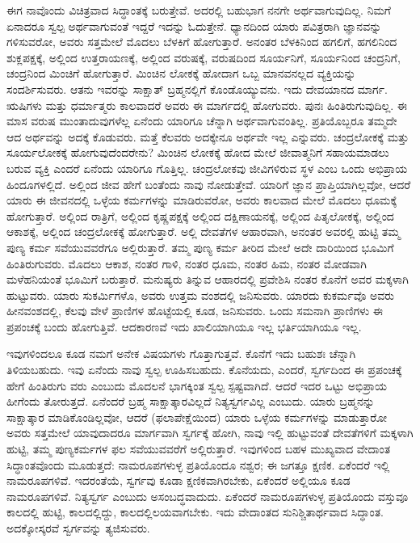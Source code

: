 \vskip 5pt

ಈಗ ನಾವೊಂದು ವಿಚಿತ್ರವಾದ ಸಿದ್ಧಾಂತಕ್ಕೆ ಬರುತ್ತೇವೆ. ಅದರಲ್ಲಿ ಬಹುಭಾಗ ನನಗೇ ಅರ್ಥವಾಗುವುದಿಲ್ಲ. ನಿಮಗೆ ಏನಾದರೂ ಸ್ವಲ್ಪ ಅರ್ಥವಾಗುವಂತೆ ಇದ್ದರೆ ಇದನ್ನು ಓದುತ್ತೇನೆ. ಧ್ಯಾನದಿಂದ ಯಾರು ಪವಿತ್ರರಾಗಿ ಜ್ಞಾನವನ್ನು ಗಳಿಸುವರೋ, ಅವರು ಸತ್ತಮೇಲೆ ಮೊದಲು ಬೆಳಕಿಗೆ ಹೋಗುತ್ತಾರೆ. ಅನಂತರ ಬೆಳಕಿನಿಂದ ಹಗಲಿಗೆ, ಹಗಲಿನಿಂದ ಶುಕ್ಲಪಕ್ಷಕ್ಕೆ, ಅಲ್ಲಿಂದ ಉತ್ತರಾಯಣಕ್ಕೆ, ಅಲ್ಲಿಂದ ವರುಷಕ್ಕೆ, ವರುಷದಿಂದ ಸೂರ್ಯನಿಗೆ, ಸೂರ್ಯನಿಂದ ಚಂದ್ರನಿಗೆ, ಚಂದ್ರನಿಂದ ಮಿಂಚಿಗೆ ಹೋಗುತ್ತಾರೆ. ಮಿಂಚಿನ ಲೋಕಕ್ಕೆ ಹೋದಾಗ ಒಬ್ಬ ಮಾನವನಲ್ಲದ ವ್ಯಕ್ತಿಯನ್ನು ಸಂದರ್ಶಿಸುವರು. ಆತನು ಇವರನ್ನು ಸಾಕ್ಷಾತ್​ ಬ್ರಹ್ಮನಲ್ಲಿಗೆ ಕೊಂಡೊಯ್ಯುವನು. ಇದು ದೇವಯಾನದ ಮಾರ್ಗ. ಋಷಿಗಳು ಮತ್ತು ಧರ್ಮಾತ್ಮರು ಕಾಲವಾದರೆ ಅವರು ಈ ಮಾರ್ಗದಲ್ಲಿ ಹೋಗುವರು. ಪುನಃ ಹಿಂತಿರುಗುವುದಿಲ್ಲ. ಈ ಮಾಸ ವರುಷ ಮುಂತಾದುವುಗಳೆಲ್ಲ ಏನೆಂದು ಯಾರಿಗೂ ಚೆನ್ನಾಗಿ ಅರ್ಥವಾಗುವಂತಿಲ್ಲ. ಪ್ರತಿಯೊಬ್ಬರೂ ತಮ್ಮದೇ ಆದ ಅರ್ಥವನ್ನು ಅದಕ್ಕೆ ಕೊಡುವರು. ಮತ್ತೆ ಕೆಲವರು ಅದಕ್ಕೇನೂ ಅರ್ಥವೇ ಇಲ್ಲ ಎನ್ನುವರು. ಚಂದ್ರಲೋಕಕ್ಕೆ ಮತ್ತು ಸೂರ್ಯಲೋಕಕ್ಕೆ ಹೋಗುವುದೆಂದರೇನು? ಮಿಂಚಿನ ಲೋಕಕ್ಕೆ ಹೋದ ಮೇಲೆ ಜೀವಾತ್ಮನಿಗೆ ಸಹಾಯಮಾಡಲು ಬರುವ ವ್ಯಕ್ತಿ ಎಂದರೆ ಏನೆಂದು ಯಾರಿಗೂ ಗೊತ್ತಿಲ್ಲ. ಚಂದ್ರಲೋಕವು ಜೀವಿಗಳಿರುವ ಸ್ಥಳ ಎಂಬ ಒಂದು ಅಭಿಪ್ರಾಯ ಹಿಂದೂಗಳಲ್ಲಿದೆ. ಅಲ್ಲಿಂದ ಜೀವ ಹೇಗೆ ಬಂತೆಂದು ನಾವು ನೋಡುತ್ತೇವೆ. ಯಾರಿಗೆ ಜ್ಞಾನ ಪ್ರಾಪ್ತಿಯಾಗಿಲ್ಲವೋ, ಆದರೆ ಯಾರು ಈ ಜೀವನದಲ್ಲಿ ಒಳ್ಳೆಯ ಕರ್ಮಗಳನ್ನು ಮಾಡಿರುವರೋ, ಅವರು ಕಾಲವಾದ ಮೇಲೆ ಮೊದಲು ಧೂಮಕ್ಕೆ ಹೋಗುತ್ತಾರೆ. ಅಲ್ಲಿಂದ ರಾತ್ರಿಗೆ, ಅಲ್ಲಿಂದ ಕೃಷ್ಣಪಕ್ಷಕ್ಕೆ ಅಲ್ಲಿಂದ ದಕ್ಷಿಣಾಯನಕ್ಕೆ, ಅಲ್ಲಿಂದ ಪಿತೃಲೋಕಕ್ಕೆ, ಅಲ್ಲಿಂದ ಆಕಾಶಕ್ಕೆ, ಅಲ್ಲಿಂದ ಚಂದ್ರಲೋಕಕ್ಕೆ ಹೋಗುತ್ತಾರೆ. ಅಲ್ಲಿ ದೇವತೆಗಳ ಆಹಾರವಾಗಿ, ಅನಂತರ ಅವರಲ್ಲಿ ಹುಟ್ಟಿ ತಮ್ಮ ಪುಣ್ಯ ಕರ್ಮ ಸವೆಯುವವರೆಗೂ ಅಲ್ಲಿರುತ್ತಾರೆ. ತಮ್ಮ ಪುಣ್ಯ ಕರ್ಮ ತೀರಿದ ಮೇಲೆ ಅದೇ ದಾರಿಯಿಂದ ಭೂಮಿಗೆ ಹಿಂತಿರುಗುವರು. ಮೊದಲು ಆಕಾಶ, ನಂತರ ಗಾಳಿ, ನಂತರ ಧೂಮ, ನಂತರ ಹಿಮ, ನಂತರ ಮೋಡವಾಗಿ ಮಳೆಹನಿಯಂತೆ ಭೂಮಿಗೆ ಬರುತ್ತಾರೆ. ಮನುಷ್ಯರು ತಿನ್ನುವ ಆಹಾರದಲ್ಲಿ ಪ್ರವೇಶಿಸಿ ನಂತರ ಕೊನೆಗೆ ಅವರ ಮಕ್ಕಳಾಗಿ ಹುಟ್ಟುವರು. ಯಾರು ಸುಕರ್ಮಿಗಳೊ, ಅವರು ಉತ್ತಮ ವಂಶದಲ್ಲಿ ಜನಿಸುವರು. ಯಾರದು ಕುಕರ್ಮವೊ ಅವರು ಹೀನವಂಶದಲ್ಲಿ, ಕೆಲವು ವೇಳೆ ಪ್ರಾಣಿಗಳ ಹೊಟ್ಟೆಯಲ್ಲಿ ಕೂಡ, ಜನಿಸುವರು. ಒಂದು ಸಮನಾಗಿ ಪ್ರಾಣಿಗಳು ಈ ಪ್ರಪಂಚಕ್ಕೆ ಬಂದು ಹೋಗುತ್ತಿವೆ. ಆದಕಾರಣವೆ ಇದು ಖಾಲಿಯಾಗಿಯೂ ಇಲ್ಲ ಭರ್ತಿಯಾಗಿಯೂ ಇಲ್ಲ. 

\eject

ಇವುಗಳಿಂದಲೂ ಕೂಡ ನಮಗೆ ಅನೇಕ ವಿಷಯಗಳು ಗೊತ್ತಾಗುತ್ತವೆ. ಕೊನೆಗೆ ಇದು ಬಹುಶಃ ಚೆನ್ನಾಗಿ ತಿಳಿಯಬಹುದು. ಇವು ಏನೆಂದು ನಾವು ಸ್ವಲ್ಪ ಊಹಿಸಬಹುದು. ಕೊನೆಯದು, ಎಂದರೆ, ಸ್ವರ್ಗದಿಂದ ಈ ಪ್ರಪಂಚಕ್ಕೆ ಹೇಗೆ ಹಿಂತಿರುಗು ವರು ಎಂಬುದು ಮೊದಲನೆ ಭಾಗಕ್ಕಿಂತ ಸ್ವಲ್ಪ ಸ್ಪಷ್ಟವಾಗಿದೆ. ಆದರೆ ಇದರ ಒಟ್ಟು ಅಭಿಪ್ರಾಯ ಹೀಗೆಂದು ತೋರುತ್ತದೆ. ಏನೆಂದರೆ ಬ್ರಹ್ಮ ಸಾಕ್ಷಾತ್ಕಾರವಿಲ್ಲದೆ ನಿತ್ಯಸ್ವರ್ಗವಿಲ್ಲ ಎಂಬುದು. ಯಾರು ಬ್ರಹ್ಮನನ್ನು ಸಾಕ್ಷಾತ್ಕಾರ ಮಾಡಿಕೊಂಡಿಲ್ಲವೋ, ಆದರೆ (ಫಲಾಪೇಕ್ಷೆಯಿಂದ) ಯಾರು ಒಳ್ಳೆಯ ಕರ್ಮಗಳನ್ನು ಮಾಡುತ್ತಾರೋ ಅವರು ಸತ್ತಮೇಲೆ ಯಾವುದಾದರೂ ಮಾರ್ಗವಾಗಿ ಸ್ವರ್ಗಕ್ಕೆ ಹೋಗಿ, ನಾವು ಇಲ್ಲಿ ಹುಟ್ಟುವಂತೆ ದೇವತೆಗಳಿಗೆ ಮಕ್ಕಳಾಗಿ ಹುಟ್ಟಿ, ತಮ್ಮ ಪುಣ್ಯಕರ್ಮಗಳ ಫಲ ಸವೆಯುವವರೆಗೆ ಅಲ್ಲಿರುತ್ತಾರೆ. ಇವುಗಳಿಂದ ಬಹಳ ಮುಖ್ಯವಾದ ವೇದಾಂತ ಸಿದ್ಧಾಂತವೊಂದು ಮೂಡುತ್ತದೆ: ನಾಮರೂಪಗಳುಳ್ಳ ಪ್ರತಿಯೊಂದೂ ನಶ್ವರ; ಈ ಜಗತ್ತೂ ಕ್ಷಣಿಕ. ಏಕೆಂದರೆ ಇಲ್ಲಿ ನಾಮರೂಪಗಳಿವೆ. ಇದರಂತೆಯೆ, ಸ್ವರ್ಗವು ಕೂಡಾ ಕ್ಷಣಿಕವಾಗಿರಬೇಕು, ಏಕೆಂದರೆ ಅಲ್ಲಿಯೂ ಕೂಡ ನಾಮರೂಪಗಳಿವೆ. ನಿತ್ಯಸ್ವರ್ಗ ಎಂಬುದು ಅಸಂಬದ್ಧವಾದುದು. ಏಕೆಂದರೆ ನಾಮರೂಪಗಳುಳ್ಳ ಪ್ರತಿಯೊಂದು ವಸ್ತುವೂ ಕಾಲದಲ್ಲಿ ಹುಟ್ಟಿ, ಕಾಲದಲ್ಲಿದ್ದು, ಕಾಲದಲ್ಲಿಲಯವಾಗಬೇಕು. ಇದು ವೇದಾಂತದ ಸುನಿಶ್ಚಿತಾರ್ಥವಾದ ಸಿದ್ಧಾಂತ. ಅದಕ್ಕೋಸ್ಕರವೆ ಸ್ವರ್ಗವನ್ನು ತ್ಯಜಿಸುವರು. 

